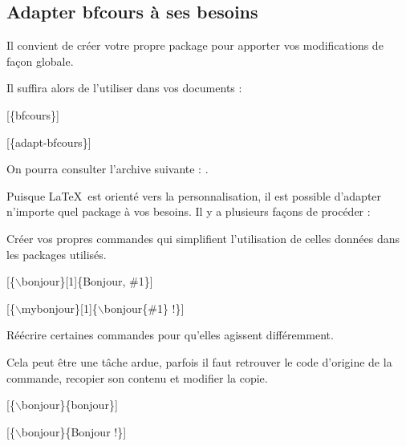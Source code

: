 \subsection{Adapter bfcours à ses besoins}

\begin{Methode}
 \begin{MultiColonnes}{3}
    \tcbitem[raster multicolumn=2] Il convient de créer votre propre package pour apporter vos modifications de façon globale. 

Il suffira alors de l'utiliser dans vos documents : 

[\{bfcours\}]

[\{adapt-bfcours\}]

    \tcbitem \bclampe On pourra consulter l'archive suivante : .
 \end{MultiColonnes}
\end{Methode}
\begin{Methode}
Puisque \LaTeX\ est orienté vers la personnalisation, il est possible d'adapter n'importe quel package à vos besoins. 
Il y a plusieurs façons de procéder : 
\begin{tcbenumerate}[2]
    \tcbitem Créer vos propres commandes qui simplifient l'utilisation de celles données dans les packages utilisés. 


    [\{$\backslash$bonjour\}[1]\{Bonjour, \#1\}] 


    [\{$\backslash$mybonjour\}[1]\{$\backslash$bonjour\{\#1\} !\}] 

    \tcbitem Réécrire certaines commandes pour qu'elles agissent différemment. 

    Cela peut être une tâche ardue, parfois il faut retrouver le code d'origine de la commande, recopier son contenu et modifier la copie. 


    [\{$\backslash$bonjour\}\{bonjour\}] 


    [\{$\backslash$bonjour\}\{Bonjour !\}] 
\end{tcbenumerate}
\end{Methode}


